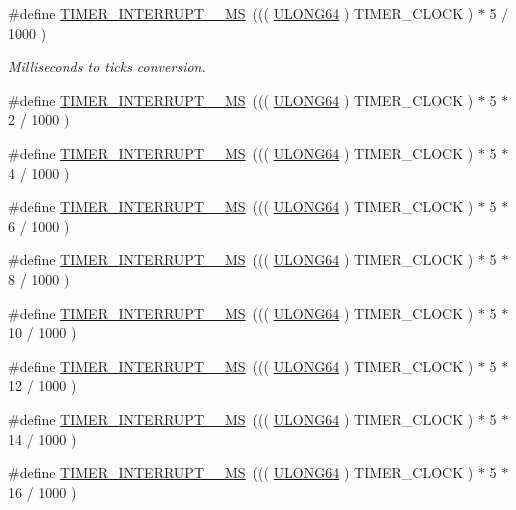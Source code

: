 \begin{DoxyCompactItemize}
\item 
\#define \hyperlink{a00673_ga85adb3cf09e71797fa296930193832b4}{TIMER\_\-INTERRUPT\_\_\-MS}~((( \hyperlink{a00660_ga28961430434ccabca6862ea93fe9a15b}{ULONG64} ) TIMER\_\-CLOCK ) $\ast$ 5 / 1000 )
\begin{DoxyCompactList}\small\item\em Milliseconds to ticks conversion. \end{DoxyCompactList}\item 
\#define \hyperlink{a00673_ga15be38412cbf707fb1713528a5f5e6b3}{TIMER\_\-INTERRUPT\_\_\-MS}~((( \hyperlink{a00660_ga28961430434ccabca6862ea93fe9a15b}{ULONG64} ) TIMER\_\-CLOCK ) $\ast$ 5 $\ast$ 2 / 1000 )
\item 
\#define \hyperlink{a00673_ga0680372985c2ad123fd4e1984f1ff9a1}{TIMER\_\-INTERRUPT\_\_\-MS}~((( \hyperlink{a00660_ga28961430434ccabca6862ea93fe9a15b}{ULONG64} ) TIMER\_\-CLOCK ) $\ast$ 5 $\ast$ 4 / 1000 )
\item 
\#define \hyperlink{a00673_gac9f2593e6b663668cd0d1420e4a5f609}{TIMER\_\-INTERRUPT\_\_\-MS}~((( \hyperlink{a00660_ga28961430434ccabca6862ea93fe9a15b}{ULONG64} ) TIMER\_\-CLOCK ) $\ast$ 5 $\ast$ 6 / 1000 )
\item 
\#define \hyperlink{a00673_ga13b2586797ac950024aa46134ba569ab}{TIMER\_\-INTERRUPT\_\_\-MS}~((( \hyperlink{a00660_ga28961430434ccabca6862ea93fe9a15b}{ULONG64} ) TIMER\_\-CLOCK ) $\ast$ 5 $\ast$ 8 / 1000 )
\item 
\#define \hyperlink{a00673_gac0bd52bbc8f9d73f2e518d376e775d03}{TIMER\_\-INTERRUPT\_\_\-MS}~((( \hyperlink{a00660_ga28961430434ccabca6862ea93fe9a15b}{ULONG64} ) TIMER\_\-CLOCK ) $\ast$ 5 $\ast$ 10 / 1000 )
\item 
\#define \hyperlink{a00673_ga05c2fdd777df5b88de99e08ab97b882b}{TIMER\_\-INTERRUPT\_\_\-MS}~((( \hyperlink{a00660_ga28961430434ccabca6862ea93fe9a15b}{ULONG64} ) TIMER\_\-CLOCK ) $\ast$ 5 $\ast$ 12 / 1000 )
\item 
\#define \hyperlink{a00673_ga2e708b60d3621f4c13bcd07001696d57}{TIMER\_\-INTERRUPT\_\_\-MS}~((( \hyperlink{a00660_ga28961430434ccabca6862ea93fe9a15b}{ULONG64} ) TIMER\_\-CLOCK ) $\ast$ 5 $\ast$ 14 / 1000 )
\item 
\#define \hyperlink{a00673_ga363db70188865e3d222337dfd68cd5f1}{TIMER\_\-INTERRUPT\_\_\-MS}~((( \hyperlink{a00660_ga28961430434ccabca6862ea93fe9a15b}{ULONG64} ) TIMER\_\-CLOCK ) $\ast$ 5 $\ast$ 16 / 1000 )
\item 

\end{DoxyCompactItemize}
